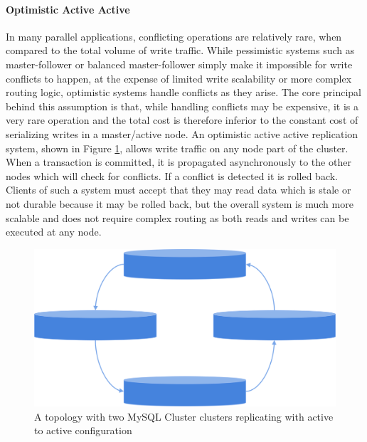 \paragraph{Optimistic Active Active}
In many parallel applications, conflicting operations are relatively rare, when compared to the total volume of write traffic.
While pessimistic systems such as master-follower or balanced master-follower simply make it impossible for write conflicts to happen, at the expense of limited write scalability or more complex routing logic, optimistic systems handle conflicts as they arise.
The core principal behind this assumption is that, while handling conflicts may be expensive, it is a very rare operation and the total cost is therefore inferior to the constant cost of serializing writes in a master/active node.
An optimistic active active replication system, shown in Figure \ref{fig:optimistic-active-active}, allows write traffic on any node part of the cluster.
When a transaction is committed, it is propagated asynchronously to the other nodes which will check for conflicts. If a conflict is detected it is rolled back.
Clients of such a system must accept that they may read data which is stale or not durable because it may be rolled back, but the overall system is much more scalable and does not require complex routing as both reads and writes can be executed at any node.

\begin{figure}[h]
\caption{A topology with two MySQL Cluster clusters replicating with active to active configuration}
\label{fig:optimistic-active-active}
\centering
\includegraphics[width=1.0\textwidth]{images/optimistic-active-active.png}
\end{figure}

